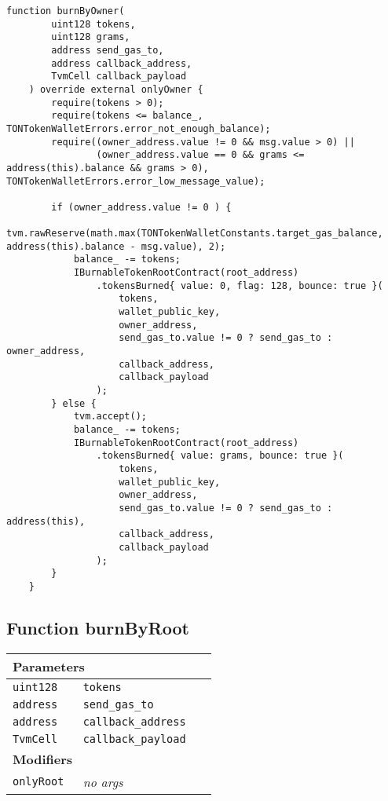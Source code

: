 \begin{lstlisting}[firstnumber=473]
    function burnByOwner(
        uint128 tokens,
        uint128 grams,
        address send_gas_to,
        address callback_address,
        TvmCell callback_payload
    ) override external onlyOwner {
        require(tokens > 0);
        require(tokens <= balance_, TONTokenWalletErrors.error_not_enough_balance);
        require((owner_address.value != 0 && msg.value > 0) ||
                (owner_address.value == 0 && grams <= address(this).balance && grams > 0), TONTokenWalletErrors.error_low_message_value);

        if (owner_address.value != 0 ) {
            tvm.rawReserve(math.max(TONTokenWalletConstants.target_gas_balance, address(this).balance - msg.value), 2);
            balance_ -= tokens;
            IBurnableTokenRootContract(root_address)
                .tokensBurned{ value: 0, flag: 128, bounce: true }(
                    tokens,
                    wallet_public_key,
                    owner_address,
                    send_gas_to.value != 0 ? send_gas_to : owner_address,
                    callback_address,
                    callback_payload
                );
        } else {
            tvm.accept();
            balance_ -= tokens;
            IBurnableTokenRootContract(root_address)
                .tokensBurned{ value: grams, bounce: true }(
                    tokens,
                    wallet_public_key,
                    owner_address,
                    send_gas_to.value != 0 ? send_gas_to : address(this),
                    callback_address,
                    callback_payload
                );
        }
    }
\end{lstlisting}

\subsection{Function burnByRoot}


\ifsoltables
\noindent\begin{tabular}{|l|l|p{5cm}|}\hline
\multicolumn{3}{|l|}{\bf Parameters}\\\hline
\tt uint128 & \tt tokens &\\\hline
\tt address & \tt send\_{}gas\_{}to &\\\hline
\tt address & \tt callback\_{}address &\\\hline
\tt TvmCell & \tt callback\_{}payload &\\\hline
\multicolumn{3}{|l|}{\bf Modifiers}\\\hline
\tt onlyRoot & {\em no args} &\\\hline
\end{tabular}
\fi

